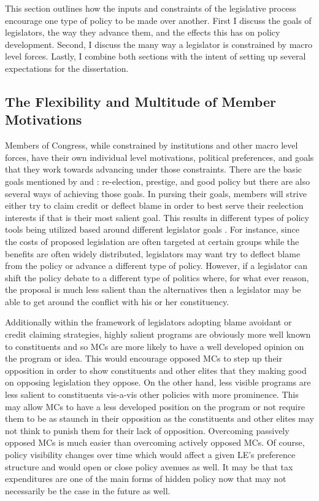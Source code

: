 \documentclass[12pt]{article}
\begin{document}
This section outlines how the inputs and constraints of the legislative process encourage one type of policy to be made over another. First I discuss the goals of legislators, the way they advance them, and the effects this has on policy development. Second, I discuss the many way a legislator is constrained by macro level forces. Lastly, I combine both sections with the intent of setting up several expectations for the dissertation.

\subsection{The Flexibility and Multitude of Member Motivations}
Members of Congress, while constrained by institutions and other macro level forces, have their own individual level motivations, political preferences, and goals that they work towards advancing under those constraints. There are the basic goals mentioned by \citet{mayhew1974} and \citet{fenno1973}: re-election, prestige, and good policy but there are also several ways of achieving those goals. In pursing their goals, members will strive either try to claim credit or deflect blame in order to best serve their reelection interests if that is their most salient goal. This results in different types of policy tools being utilized based around different legislator goals \citep{weaver1986}. For instance, since the costs of proposed legislation are often targeted at certain groups while the benefits are often widely distributed, legislators may want try to deflect blame from the policy or advance a different type of policy. However, if a legislator can shift the policy debate to a different type of politics where, for what ever reason, the proposal is much less salient than the alternatives then a legislator may be able to get around the conflict with his or her constituency.

Additionally within the framework of legislators adopting blame avoidant or credit claiming strategies, highly salient programs are obviously more well known to constituents and so MCs are more likely to have a well developed opinion on the program or idea. This would encourage opposed MCs to step up their opposition in order to show constituents and other elites that they making good on opposing legislation they oppose. On the other hand, less visible programs are less salient to constituents vis-a-vis other policies with more prominence. This may allow MCs to have a less developed position on the program or not require them to be as staunch in their opposition as the constituents and other elites may not think to punish them for their lack of opposition. Overcoming passively opposed MCs is much easier than overcoming actively opposed MCs. Of course, policy visibility changes over time which would affect a given LE's preference structure and would open or close policy avenues as well. It may be that tax expenditures are one of the main forms of hidden policy now that may not necessarily be the case in the future as well. 
\end{document}
